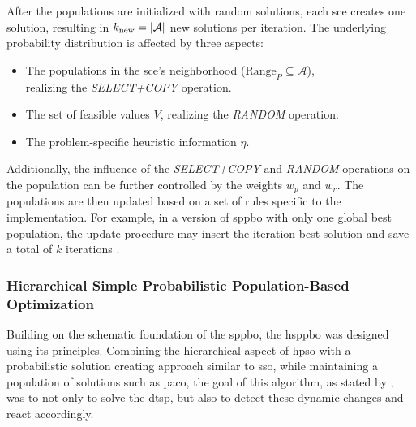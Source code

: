 After the populations are initialized with random solutions, each \gls{sce} creates one solution, resulting in $k_{\text{new}} = \left\lvert\mathcal{A}\right\rvert$ new solutions per iteration. The underlying probability distribution is affected by three aspects:
\begin{itemize}
	\item The populations in the \gls{sce}'s neighborhood ($\text{Range}_P \subseteq \mathcal{A}$),\\realizing the \textit{SELECT+COPY} operation.
	\item The set of feasible values $V$, realizing the \textit{RANDOM} operation.
	\item The problem-specific heuristic information $\eta$.
\end{itemize}
Additionally, the influence of the \textit{SELECT+COPY} and \textit{RANDOM} operations on the population can be further controlled by the weights $w_p$ and $w_r$. The populations are then updated based on a set of rules specific to the implementation. For example, in a version of \gls{sppbo} with only one global best population, the update procedure may insert the iteration best solution and save a total of $k$ iterations \cite{lin2015simple}.

\subsubsection{Hierarchical Simple Probabilistic Population-Based Optimization}
\label{chap:hsppbo}

Building on the schematic foundation of the \gls{sppbo}, the \gls{hsppbo} was designed using its principles. Combining the hierarchical aspect of \gls{hpso} with a probabilistic solution creating approach similar to \gls{sso}, while maintaining a population of solutions such as \gls{paco}, the goal of this algorithm, as stated by \citet{kupfer2021hierarchical}, was to not only to solve the \gls{dtsp}, but also to detect these dynamic changes and react accordingly. 

